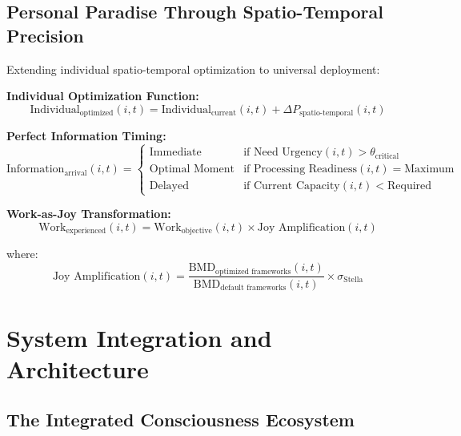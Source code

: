 \documentclass[12pt,a4paper]{article}
\begin{document}
\subsection{Personal Paradise Through Spatio-Temporal Precision}

Extending individual spatio-temporal optimization to universal deployment:

\textbf{Individual Optimization Function:}
\begin{equation}
\text{Individual}_{\text{optimized}}(i,t) = \text{Individual}_{\text{current}}(i,t) + \Delta P_{\text{spatio-temporal}}(i,t)
\end{equation}

\textbf{Perfect Information Timing:}
\begin{equation}
\text{Information}_{\text{arrival}}(i,t) = \begin{cases}
\text{Immediate} & \text{if Need Urgency}(i,t) > \theta_{\text{critical}} \\
\text{Optimal Moment} & \text{if Processing Readiness}(i,t) = \text{Maximum} \\
\text{Delayed} & \text{if Current Capacity}(i,t) < \text{Required}
\end{cases}
\end{equation}

\textbf{Work-as-Joy Transformation:}
\begin{equation}
\text{Work}_{\text{experienced}}(i,t) = \text{Work}_{\text{objective}}(i,t) \times \text{Joy Amplification}(i,t)
\end{equation}

where:
\begin{equation}
\text{Joy Amplification}(i,t) = \frac{\text{BMD}_{\text{optimized frameworks}}(i,t)}{\text{BMD}_{\text{default frameworks}}(i,t)} \times \sigma_{\text{Stella}}
\end{equation}

\section{System Integration and Architecture}

\subsection{The Integrated Consciousness Ecosystem}
\end{document}
